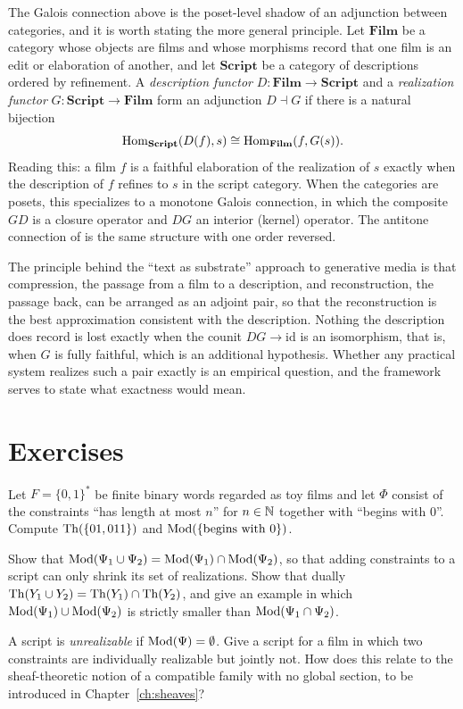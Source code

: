 The Galois connection above is the poset-level shadow of an adjunction between categories, and it is worth stating the more general principle. Let $\mathbf{Film}$ be a category whose objects are films and whose morphisms record that one film is an edit or elaboration of another, and let $\mathbf{Script}$ be a category of descriptions ordered by refinement. A \emph{description functor} $D:\mathbf{Film}\to\mathbf{Script}$ and a \emph{realization functor} $G:\mathbf{Script}\to\mathbf{Film}$ form an adjunction $D\dashv G$ if there is a natural bijection
\[
\operatorname{Hom}_{\mathbf{Script}}(D(f),s)\cong\operatorname{Hom}_{\mathbf{Film}}(f,G(s)).
\]
Reading this: a film $f$ is a faithful elaboration of the realization of $s$ exactly when the description of $f$ refines to $s$ in the script category. When the categories are posets, this specializes to a monotone Galois connection, in which the composite $GD$ is a closure operator and $DG$ an interior (kernel) operator. The antitone connection of  is the same structure with one order reversed.

The principle behind the ``text as substrate'' approach to generative media is that compression, the passage from a film to a description, and reconstruction, the passage back, can be arranged as an adjoint pair, so that the reconstruction is the best approximation consistent with the description. Nothing the description does record is lost exactly when the counit $DG\to\mathrm{id}$ is an isomorphism, that is, when $G$ is fully faithful, which is an additional hypothesis. Whether any practical system realizes such a pair exactly is an empirical question, and the framework serves to state what exactness would mean.

\section*{Exercises}

\begin{exercise}
Let $F=\{0,1\}^*$ be finite binary words regarded as toy films and let $\Phi$ consist of the constraints ``has length at most $n$'' for $n\in\mathbb{N}$ together with ``begins with $0$''. Compute $\operatorname{Th}(\{01,011\})$ and $\operatorname{Mod}(\{\text{begins with }0\})$.
\end{exercise}

\begin{exercise}
Show that $\operatorname{Mod}(\Psi_1\cup\Psi_2)=\operatorname{Mod}(\Psi_1)\cap\operatorname{Mod}(\Psi_2)$, so that adding constraints to a script can only shrink its set of realizations. Show that dually $\operatorname{Th}(Y_1\cup Y_2)=\operatorname{Th}(Y_1)\cap\operatorname{Th}(Y_2)$, and give an example in which $\operatorname{Mod}(\Psi_1)\cup\operatorname{Mod}(\Psi_2)$ is strictly smaller than $\operatorname{Mod}(\Psi_1\cap\Psi_2)$.
\end{exercise}

\begin{exercise}
A script is \emph{unrealizable} if $\operatorname{Mod}(\Psi)=\emptyset$. Give a script for a film in which two constraints are individually realizable but jointly not. How does this relate to the sheaf-theoretic notion of a compatible family with no global section, to be introduced in Chapter~\ref{ch:sheaves}?
\end{exercise}
